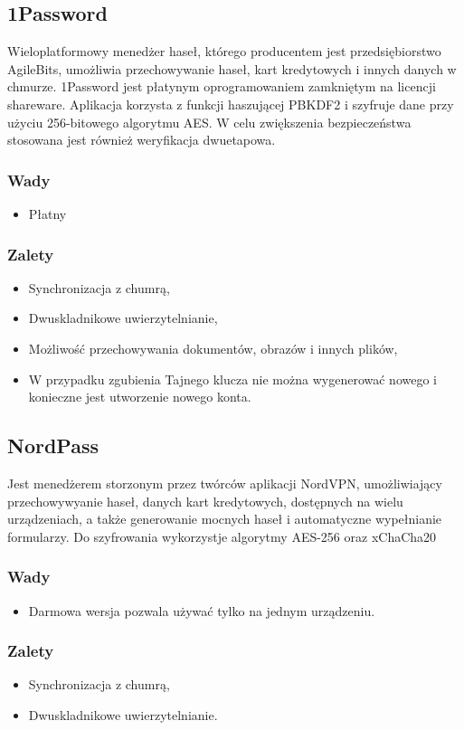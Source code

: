 \subsection{1Password}
Wieloplatformowy menedżer haseł, którego producentem jest przedsiębiorstwo AgileBits, umożliwia przechowywanie haseł, kart kredytowych i innych danych w chmurze. 1Password jest płatynym oprogramowaniem zamkniętym na licencji shareware. Aplikacja korzysta z funkcji haszującej PBKDF2 i szyfruje dane przy użyciu 256-bitowego algorytmu AES. W celu zwiększenia bezpieczeństwa stosowana jest również weryfikacja dwuetapowa.
\subsubsection{Wady}
\begin{itemize}
    \item Płatny
\end{itemize}
\subsubsection{Zalety}
\begin{itemize}
    \item Synchronizacja z chumrą,
    \item Dwuskladnikowe uwierzytelnianie,
    \item Możliwość przechowywania dokumentów, obrazów i innych plików,
    \item W przypadku zgubienia Tajnego klucza nie można wygenerować nowego i konieczne jest utworzenie nowego konta.
\end{itemize}

\subsection{NordPass}
Jest menedżerem storzonym przez twórców aplikacji NordVPN, umożliwiający przechowywyanie haseł, danych kart kredytowych, dostępnych na wielu urządzeniach, a także generowanie mocnych haseł i automatyczne wypełnianie formularzy. Do szyfrowania wykorzystje algorytmy AES-256 oraz xChaCha20
\subsubsection{Wady}
\begin{itemize}
    \item Darmowa wersja pozwala używać tylko na jednym urządzeniu.
\end{itemize}
\subsubsection{Zalety}
\begin{itemize}
    \item Synchronizacja z chumrą,
    \item Dwuskladnikowe uwierzytelnianie.
\end{itemize}

